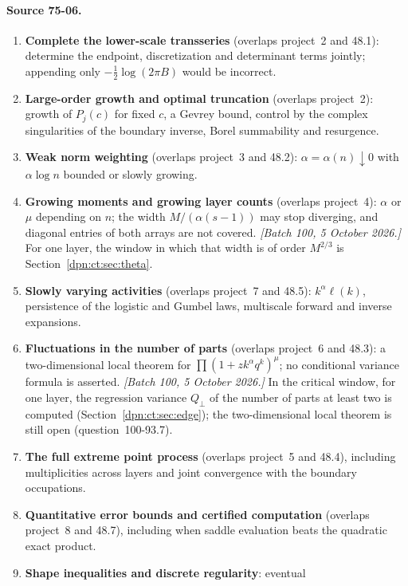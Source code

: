 \documentclass[11pt]{article}
\numberwithin{equation}{section}
\theoremstyle{definition}\newtheorem{definition}[theorem]{Definition}
\theoremstyle{remark}\newtheorem{remark}[theorem]{Remark}
\begin{document}
\paragraph{Source 75-06.}
\begin{enumerate}[label=\textbf{75-06.\arabic*}, leftmargin=*]
\item \textbf{Complete the lower-scale transseries} (overlaps project~2 and
  48.1): determine the endpoint, discretization and determinant terms jointly;
  appending only $-\frac12\log(2\pi B)$ would be incorrect.
\item \textbf{Large-order growth and optimal truncation} (overlaps project~2):
  growth of $P_j(c)$ for fixed $c$, a Gevrey bound, control by the complex
  singularities of the boundary inverse, Borel summability and resurgence.
\item \textbf{Weak norm weighting} (overlaps project~3 and 48.2):
  $\alpha=\alpha(n)\downarrow0$ with $\alpha\log n$ bounded or slowly growing.
\item \textbf{Growing moments and growing layer counts} (overlaps project~4):
  $\alpha$ or $\mu$ depending on $n$; the width $M/(\alpha(s-1))$ may stop
  diverging, and diagonal entries of both arrays are not covered.
  \textit{[Batch 100, 5 October 2026.]} For one layer, the window in which
  that width is of order $M^{2/3}$ is Section~\ref{dpn:ct:sec:theta}.
\item \textbf{Slowly varying activities} (overlaps project~7 and 48.5):
  $k^\alpha\ell(k)$, persistence of the logistic and Gumbel laws, multiscale
  forward and inverse expansions.
\item \textbf{Fluctuations in the number of parts} (overlaps project~6 and
  48.3): a two-dimensional local theorem for $\prod(1+zk^\alpha q^k)^\mu$; no
  conditional variance formula is asserted.
  \textit{[Batch 100, 5 October 2026.]} In the critical window, for one layer,
  the regression variance $Q_\perp$ of the number of parts at least two is
  computed (Section~\ref{dpn:ct:sec:edge}); the two-dimensional local theorem
  is still open (question~100-93.7).
\item \textbf{The full extreme point process} (overlaps project~5 and 48.4),
  including multiplicities across layers and joint convergence with the
  boundary occupations.
\item \textbf{Quantitative error bounds and certified computation} (overlaps
  project~8 and 48.7), including when saddle evaluation beats the quadratic
  exact product.
\item \textbf{Shape inequalities and discrete regularity}: eventual

\end{enumerate}
\end{document}
